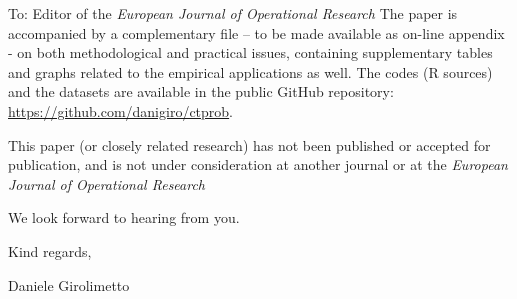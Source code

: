 \documentclass[11pt,a4paper]{letter}
\begin{document}
\begin{letter}{To: Editor of the \textit{European Journal of Operational Research}}
The paper is accompanied by a complementary file – to be made available as on-line appendix - on both methodological and practical issues, containing supplementary tables and graphs related to the empirical applications as well. The codes (R sources) and the datasets are available in the public GitHub repository: \url{https://github.com/danigiro/ctprob}.

This paper (or closely related research) has not been published or accepted for publication, and is not under consideration at another journal or at the \textit{European Journal of Operational Research}

We look forward to hearing from you.

Kind regards,

Daniele Girolimetto

 \end{letter}
\end{document}
